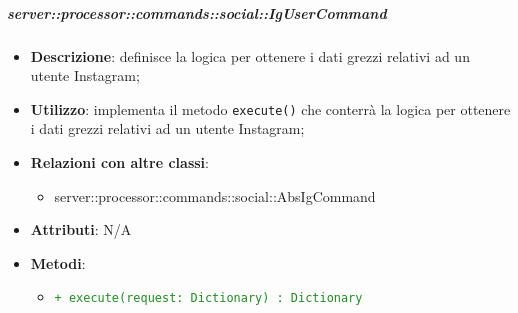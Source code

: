         \subparagraph{server::processor::commands::social::IgUserCommand} %
        \label{subp:bdsm_app_server_processor_commands_social_igusercommand}
        \begin{itemize}
          \item \textbf{Descrizione}: definisce la logica per ottenere i dati grezzi relativi ad un utente Instagram;
          \item \textbf{Utilizzo}: implementa il metodo \texttt{execute()} che conterrà la logica per ottenere i dati grezzi relativi ad un utente Instagram;
          \item \textbf{Relazioni con altre classi}:
            \begin{itemize}
              \item server::processor::commands::social::AbsIgCommand
            \end{itemize}
					\item \textbf{Attributi}: N/A
					\item \textbf{Metodi}:
        	\begin{itemize}
          		\item \textcolor{forestgreen}{\texttt{+ execute(request: Dictionary) : Dictionary}}
        	\end{itemize}
        \end{itemize}

